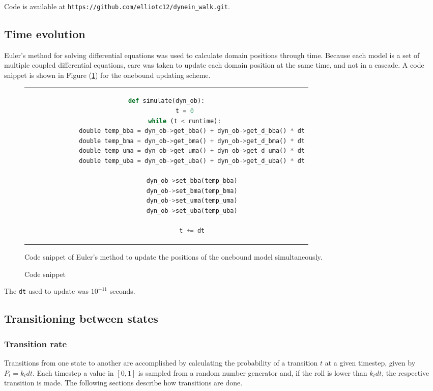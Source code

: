 \documentclass[
11pt, %
english, %
singlespacing, %
headsepline, %
chapterinoneline, %
]{MastersDoctoralThesis} %
\begin{document}
Code is available at \verb|https://github.com/elliotc12/dynein_walk.git|.

\subsection{Time evolution}
Euler's method for solving differential equations was used to calculate domain positions through time. Because each model is a set of multiple coupled differential equations, care was taken to update each domain position at the same time, and not in a cascade. A code snippet is shown in Figure (\ref{snip:euler-code-snippet}) for the onebound updating scheme.

\begin{figure}[h!]
  \centering
  \begin{tabular}{c}
    \begin{lstlisting}[language=python]
      def simulate(dyn_ob):
          t = 0
          while (t < runtime):
              double temp_bba = dyn_ob->get_bba() + dyn_ob->get_d_bba() * dt
              double temp_bma = dyn_ob->get_bma() + dyn_ob->get_d_bma() * dt
              double temp_uma = dyn_ob->get_uma() + dyn_ob->get_d_uma() * dt
              double temp_uba = dyn_ob->get_uba() + dyn_ob->get_d_uba() * dt
              
              dyn_ob->set_bba(temp_bba)
              dyn_ob->set_bma(temp_bma)
              dyn_ob->set_uma(temp_uma)
              dyn_ob->set_uba(temp_uba)
              
              t += dt
    \end{lstlisting}
  \end{tabular}
  \caption{Code snippet}{Code snippet of Euler's method to update the positions of the onebound model simultaneously.}
  \label{snip:euler-code-snippet}
\end{figure}

The \verb|dt| used to update was $10^{-11}$ seconds.

\subsection{Transitioning between states}

\subsubsection{Transition rate}
\label{sec:transitioning-states}
Transitions from one state to another are accomplished by calculating the probability of a transition $t$ at a given timestep, given by $P_{t} = k_tdt$. Each timestep a value in $[0,1]$ is sampled from a random number generator and, if the roll is lower than $k_tdt$, the respective transition is made. The following sections describe how transitions are done.\\
\end{document}
